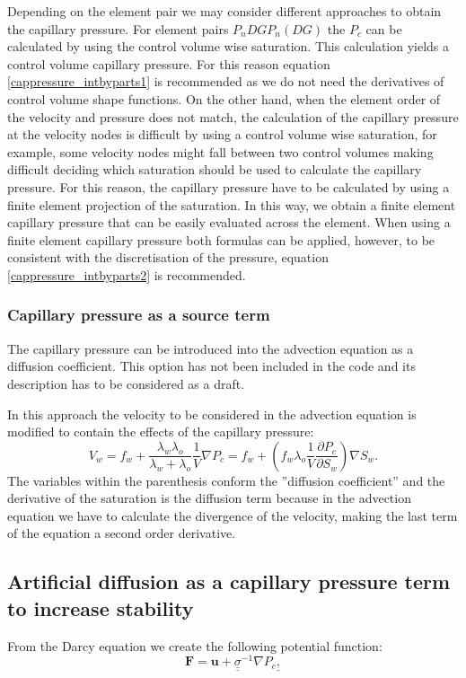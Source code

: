 Depending on the element pair we may consider different approaches to obtain the capillary pressure. For element pairs $P_nDGP_n(DG) $ the $P_c$ can be calculated by using the control volume wise saturation. This calculation yields a control volume capillary pressure. For this reason equation \ref{cappressure_intbyparts1} is recommended as we do not need the derivatives of control volume shape functions.
On the other hand, when the element order of the velocity and pressure does not match, the calculation of the capillary pressure at the velocity nodes is difficult by using a control volume wise saturation, for example, some velocity nodes might fall between two control volumes making difficult deciding which saturation should be used to calculate the capillary pressure. For this reason, the capillary pressure have to be calculated by using a finite element projection of the saturation. In this way, we obtain a finite element capillary pressure that can be easily evaluated across the element. When using a finite element capillary pressure both formulas can be applied, however, to be consistent with the discretisation of the pressure, equation \ref{cappressure_intbyparts2} is recommended.

\subsubsection*{Capillary pressure as a source term}

The capillary pressure can be introduced into the advection equation as a diffusion coefficient. This option has not been included in the code and its description has to be considered as a draft.

In this approach the velocity to be considered in the advection equation is modified to contain the effects of the capillary pressure:
\begin{equation}
V_w = f_w + \frac{\lambda_w\lambda_o}{\lambda_w+\lambda_o} \frac{1}{V} \nabla P_c = f_w + \left(  f_w \lambda_o \frac{1}{V} \frac{\partial P_c}{\partial S_w} \right) \nabla S_w.
\end{equation}
The variables within the parenthesis conform the ''diffusion coefficient'' and the derivative of the saturation is the diffusion term because in the advection equation we have to calculate the divergence of the velocity, making the last term of the equation a second order derivative.



\subsection{Artificial diffusion as a capillary pressure term to increase stability }
From the Darcy equation we create the following potential function:
\begin{equation}
\mathbf{F} = \mathbf{u} + \underline {\underline\sigma}^{-1} \nabla P_c \underline ,
\end{equation}

